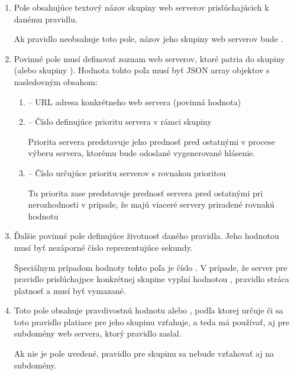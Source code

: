 \begin{enumerate}

    \item {}

    Pole obsahujúce textový názov skupiny web serverov prislúchajúcich k danému pravidlu.
    
    Ak pravidlo neobsahuje toto pole, názov jeho skupiny web serverov bude .
    
    \item {}

    Povinné pole  musí definovať zoznam web serverov, ktoré patria do skupiny  (alebo skupiny ).
    Hodnota tohto poľa musí byť JSON array objektov s nasledovným obsahom:
    \begin{enumerate}
        \item {} -- URL adresa konkrétneho web servera (povinná hodnota)
        \item {} -- Číslo definujúce prioritu servera v rámci skupiny 

        Priorita servera predstavuje jeho prednosť pred ostatnými v procese výberu servera, ktorému bude odoslané vygenerované hlásenie.
        
        \item {} -- Číslo určujúce prioritu serverov s rovnakou prioritou

        Tu priorita zase predstavuje prednosť servera pred ostatnými pri nerozhodnosti v prípade, že majú viaceré servery priradené rovnakú hodnotu 
    \end{enumerate}
    
    \item {}

    Ďalšie povinné pole definujúce životnosť daného pravidla. Jeho hodnotou musí byť nezáporné číslo reprezentujúce sekundy.

    Špeciálnym prípadom hodnoty tohto poľa je číslo . 
    V prípade, že server pre pravidlo prislúchajpce konkrétnej skupine  vyplní  hodnotou , pravidlo stráca platnosť a musí byť vymazané.
    
    \item {}

    Toto pole obsahuje pravdivostnú hodnotu  alebo , podľa ktorej určuje či sa toto pravidlo platiace pre jeho skupinu  vzťahuje, a teda má používať, aj pre subdomény web servera, ktorý pravidlo zaslal.

    Ak nie je pole uvedené, pravidlo pre skupinu  sa nebude vzťahovať aj na subdomény.
    
\end{enumerate}

